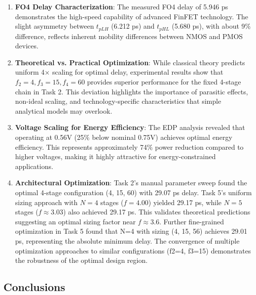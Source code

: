 \documentclass[UTF8,12pt,a4paper]{ctexart}
\begin{document}
\begin{enumerate}
    \item \textbf{FO4 Delay Characterization}: The measured FO4 delay of 5.946 ps demonstrates the high-speed capability of advanced FinFET technology. The slight asymmetry between $t_{pLH}$ (6.212 ps) and $t_{pHL}$ (5.680 ps), with about 9\% difference, reflects inherent mobility differences between NMOS and PMOS devices.

    \item \textbf{Theoretical vs. Practical Optimization}: While classical theory predicts uniform 4× scaling for optimal delay, experimental results show that $f_2=4, f_3=15, f_4=60$ provides superior performance for the fixed 4-stage chain in Task 2. This deviation highlights the importance of parasitic effects, non-ideal scaling, and technology-specific characteristics that simple analytical models may overlook.
    
    \item \textbf{Voltage Scaling for Energy Efficiency}: The EDP analysis revealed that operating at 0.56V (25\% below nominal 0.75V) achieves optimal energy efficiency. This represents approximately 74\% power reduction compared to higher voltages, making it highly attractive for energy-constrained applications.
    
    \item \textbf{Architectural Optimization}: Task 2's manual parameter sweep found the optimal 4-stage configuration (4, 15, 60) with 29.07 ps delay. Task 5's uniform sizing approach with $N=4$ stages ($f = 4.00$) yielded 29.17 ps, while $N=5$ stages ($f \approx 3.03$) also achieved 29.17 ps. This validates theoretical predictions suggesting an optimal sizing factor near $f \approx 3.6$. Further fine-grained optimization in Task 5 found that N=4 with sizing (4, 15, 56) achieves 29.01 ps, representing the absolute minimum delay. The convergence of multiple optimization approaches to similar configurations (f2=4, f3=15) demonstrates the robustness of the optimal design region.
\end{enumerate}

\subsection{Conclusions}
\end{document}
